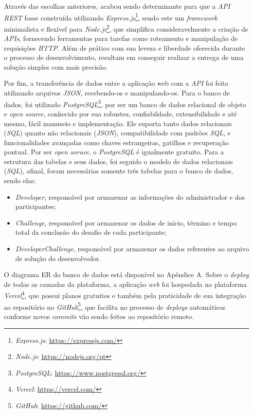 \documentclass[english,brazilian]{UNISINOSartigo} %
\begin{document}
Através das escolhas anteriores, acabou sendo determinante para que a \textit{API REST} fosse construída utilizando \textit{Express.js}\footnote{\textit{Express.js}: \url{https://expressjs.com/}}, sendo este um \textit{framework} minimalista e flexível para \textit{Node.js}\footnote{\textit{Node.js}: \url{https://nodejs.org/pt}}, que simplifica consideravelmente a criação de \textit{APIs}, fornecendo ferramentas para tarefas como roteamento e manipulação de requisições \textit{HTTP}. Além de prático com sua leveza e liberdade oferecida durante o processo de desenvolvimento, resultam em conseguir realizar a entrega de uma solução simples com mais precisão.

Por fim, a transferência de dados entre a aplicação web com a \textit{API} foi feita utilizando arquivos \textit{JSON}, recebendo-os e manipulando-os. Para o banco de dados, foi utilizado \textit{PostgreSQL}\footnote{\textit{PostgreSQL}: \url{https://www.postgresql.org/}}, por ser um banco de dados relacional de objeto e \textit{open source}, conhecido por sua robustez, confiabildade, extensibilidade e até mesmo, fácil manuseio e implementação. Ele suporta tanto dados relacionais (\textit{SQL}) quanto não relacionais (\textit{JSON}), compatibilidade com padrões \textit{SQL}, e funcionalidades avançadas como chaves estrangeiras, gatilhos e recuperação pontual. Por ser \textit{open soruce}, o \textit{PostgreSQL} é igualmente gratuito. Para a estrutura das tabelas e seus dados, foi seguido o modelo de dados relacionais (\textit{SQL}), afinal, foram necessárias somente três tabelas para o banco de dados, sendo elas:

\begin{itemize}[leftmargin=1cm, itemsep=0.1em, topsep=0.1em]
    \item \textit{Developer}, responsável por armazenar as informações do administrador e dos participantes;
    \item \textit{Challenge}, responsável por armazenar os dados de início, término e tempo total da conclusão do desafio de cada participante;
    \item \textit{DeveloperChallenge}, responsável por armazenar os dados referentes ao arquivo de solução do desenvolvedor.
\end{itemize}

O diagrama ER do banco de dados está disponível no Apêndice A. Sobre o \textit{deploy} de todas as camadas da plataforma, a aplicação \textit{web} foi hospedada na plataforma \textit{Vercel}\footnote{\textit{Vercel}: \url{ https://vercel.com/}}, que possui planos gratuitos e também pela  praticidade de sua integração ao repositório no \textit{GitHub}\footnote{\textit{GitHub}: \url{https://github.com/}}, que facilita no processo de \textit{deploys} automáticos conforme novos \textit{commits} vão sendo feitos ao repositório remoto.
\end{document}
